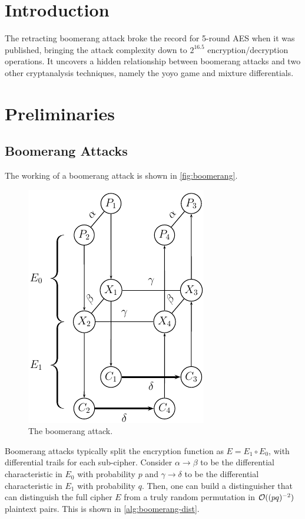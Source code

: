 \documentclass[twoside]{article}
\begin{document}



\section{Introduction}

The retracting boomerang attack broke the record for 5-round AES when it was
published, bringing the attack complexity down to \(2^{16.5}\)
encryption/decryption operations. It uncovers a hidden relationship between
boomerang attacks and two other cryptanalysis techniques, namely the yoyo game
and mixture differentials.

\section{Preliminaries}

\subsection{Boomerang Attacks}

The working of a boomerang attack is shown in \autoref{fig:boomerang}. 

\begin{figure}[!ht]
    \centering
    \includegraphics[width=0.3\columnwidth]{images/boomerang.png}
    \caption{The boomerang attack.}
    \label{fig:boomerang}
\end{figure}

Boomerang attacks typically split the encryption function as \(E = E_1 \circ
E_0\), with differential trails for each sub-cipher. Consider \(\alpha
\rightarrow \beta\) to be the differential characteristic in \(E_0\) with
probability \(p\) and \(\gamma \rightarrow \delta\) to be the differential
characteristic in \(E_1\) with probability \(q\). Then, one can build a
distinguisher that can distinguish the full cipher \(E\) from a truly random
permutation in \(\mathcal O((pq)^{-2})\) plaintext pairs. This is shown in
\autoref{alg:boomerang-dist}.
\end{document}
